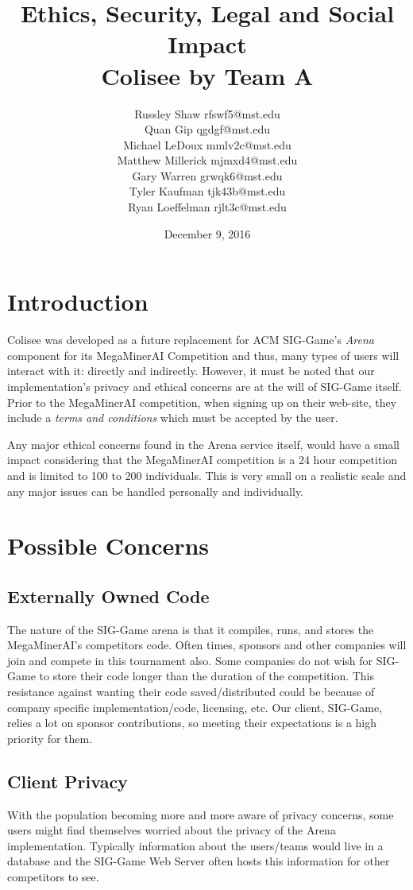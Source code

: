 \documentclass{article}
\title{Ethics, Security, Legal and Social Impact \\ Colisee by Team A}
\author{Russley Shaw rfswf5@mst.edu \\ Quan Gip qgdgf@mst.edu \\ Michael LeDoux mmlv2c@mst.edu \\ Matthew Millerick mjmxd4@mst.edu \\ Gary Warren grwqk6@mst.edu \\ Tyler Kaufman tjk43b@mst.edu \\ Ryan Loeffelman rjlt3c@mst.edu}
\date{December 9, 2016}
\begin{document}
\maketitle
\newpage

\tableofcontents
\newpage

\section{Introduction}
Colisee was developed as a future replacement for ACM SIG-Game's \textit{Arena} component for its MegaMinerAI Competition and thus, many types of users will interact with it: directly and indirectly. However, it must be noted that our implementation's privacy and ethical concerns are at the will of SIG-Game itself. Prior to the MegaMinerAI competition, when signing up on their web-site, they include a \textit{terms and conditions} which must be accepted by the user.

Any major ethical concerns found in the Arena service itself, would have a small impact considering that the MegaMinerAI competition is a 24 hour competition and is limited to 100 to 200 individuals. This is very small on a realistic scale and any major issues can be handled personally and individually.

\section{Possible Concerns}
\subsection{Externally Owned Code}
The nature of the SIG-Game arena is that it compiles, runs, and stores the MegaMinerAI's competitors code. Often times, sponsors and other companies will join and compete in this tournament also. Some companies do not wish for SIG-Game to store their code longer than the duration of the competition. This resistance against wanting their code saved/distributed could be because of company specific implementation/code, licensing, etc. Our client, SIG-Game, relies a lot on sponsor contributions, so meeting their expectations is a high priority for them. 

\subsection{Client Privacy}
With the population becoming more and more aware of privacy concerns, some users might find themselves worried about the privacy of the Arena implementation. Typically information about the users/teams would live in a database and the SIG-Game Web Server often hosts this information for other competitors to see.
\end{document}
